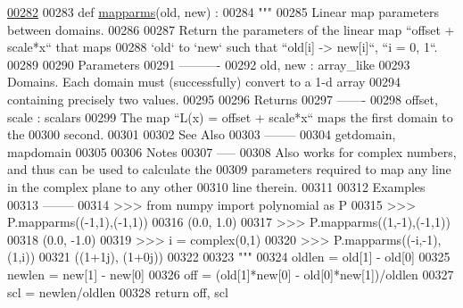 \begin{DoxyCode}
\hypertarget{namespacepyneb_1_1utils_1_1polyutils_l00282}{}\hyperlink{namespacepyneb_1_1utils_1_1polyutils_a6d5e6ebb1be7c9077ec3ae28e803c83c}{00282} 
00283 \textcolor{keyword}{def }\hyperlink{namespacepyneb_1_1utils_1_1polyutils_a6d5e6ebb1be7c9077ec3ae28e803c83c}{mapparms}(old, new) :
00284     \textcolor{stringliteral}{"""}
00285 \textcolor{stringliteral}{    Linear map parameters between domains.}
00286 \textcolor{stringliteral}{}
00287 \textcolor{stringliteral}{    Return the parameters of the linear map ``offset + scale*x`` that maps}
00288 \textcolor{stringliteral}{    `old` to `new` such that ``old[i] -> new[i]``, ``i = 0, 1``.}
00289 \textcolor{stringliteral}{}
00290 \textcolor{stringliteral}{    Parameters}
00291 \textcolor{stringliteral}{    ----------}
00292 \textcolor{stringliteral}{    old, new : array\_like}
00293 \textcolor{stringliteral}{        Domains. Each domain must (successfully) convert to a 1-d array}
00294 \textcolor{stringliteral}{        containing precisely two values.}
00295 \textcolor{stringliteral}{}
00296 \textcolor{stringliteral}{    Returns}
00297 \textcolor{stringliteral}{    -------}
00298 \textcolor{stringliteral}{    offset, scale : scalars}
00299 \textcolor{stringliteral}{        The map ``L(x) = offset + scale*x`` maps the first domain to the}
00300 \textcolor{stringliteral}{        second.}
00301 \textcolor{stringliteral}{}
00302 \textcolor{stringliteral}{    See Also}
00303 \textcolor{stringliteral}{    --------}
00304 \textcolor{stringliteral}{    getdomain, mapdomain}
00305 \textcolor{stringliteral}{}
00306 \textcolor{stringliteral}{    Notes}
00307 \textcolor{stringliteral}{    -----}
00308 \textcolor{stringliteral}{    Also works for complex numbers, and thus can be used to calculate the}
00309 \textcolor{stringliteral}{    parameters required to map any line in the complex plane to any other}
00310 \textcolor{stringliteral}{    line therein.}
00311 \textcolor{stringliteral}{}
00312 \textcolor{stringliteral}{    Examples}
00313 \textcolor{stringliteral}{    --------}
00314 \textcolor{stringliteral}{    >>> from numpy import polynomial as P}
00315 \textcolor{stringliteral}{    >>> P.mapparms((-1,1),(-1,1))}
00316 \textcolor{stringliteral}{    (0.0, 1.0)}
00317 \textcolor{stringliteral}{    >>> P.mapparms((1,-1),(-1,1))}
00318 \textcolor{stringliteral}{    (0.0, -1.0)}
00319 \textcolor{stringliteral}{    >>> i = complex(0,1)}
00320 \textcolor{stringliteral}{    >>> P.mapparms((-i,-1),(1,i))}
00321 \textcolor{stringliteral}{    ((1+1j), (1+0j))}
00322 \textcolor{stringliteral}{}
00323 \textcolor{stringliteral}{    """}
00324     oldlen = old[1] - old[0]
00325     newlen = new[1] - new[0]
00326     off = (old[1]*new[0] - old[0]*new[1])/oldlen
00327     scl = newlen/oldlen
00328     \textcolor{keywordflow}{return} off, scl

\end{DoxyCode}
